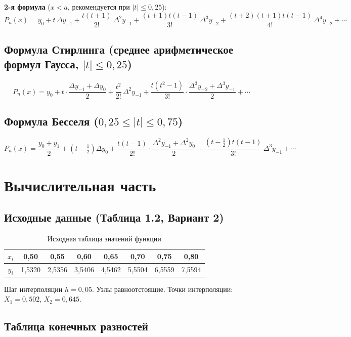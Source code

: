 \documentclass[a4paper,12pt]{article}
\begin{document}
\textbf{2-я формула} ($x<a$, рекомендуется при $|t|\le0{,}25$):
\[
  P_n(x)=y_0+t\,\Delta y_{-1}+\frac{t(t+1)}{2!}\,\Delta^2 y_{-1}
  +\frac{(t+1)t(t-1)}{3!}\,\Delta^3 y_{-2}
  +\frac{(t+2)(t+1)t(t-1)}{4!}\,\Delta^4 y_{-2}+\cdots
\]

\subsection{Формула Стирлинга (среднее арифметическое формул Гаусса, $|t|\le0{,}25$)}

\[
  P_n(x)=y_0+t\cdot\frac{\Delta y_{-1}+\Delta y_0}{2}
  +\frac{t^2}{2!}\,\Delta^2 y_{-1}
  +\frac{t(t^2-1)}{3!}\cdot\frac{\Delta^3 y_{-2}+\Delta^3 y_{-1}}{2}+\cdots
\]

\subsection{Формула Бесселя ($0{,}25\le|t|\le0{,}75$)}

\[
  P_n(x)=\frac{y_0+y_1}{2}+\!\left(t-\tfrac12\right)\!\Delta y_0
  +\frac{t(t-1)}{2!}\cdot\frac{\Delta^2 y_{-1}+\Delta^2 y_0}{2}
  +\frac{(t-\frac12)t(t-1)}{3!}\,\Delta^3 y_{-1}+\cdots
\]

\newpage
\section{Вычислительная часть}

\subsection{Исходные данные (Таблица 1.2, Вариант 2)}

\begin{table}[H]
\centering
\caption{Исходная таблица значений функции}
\begin{tabular}{|c|c|c|c|c|c|c|c|}
\hline
$x_i$ & 0{,}50 & 0{,}55 & 0{,}60 & 0{,}65 & 0{,}70 & 0{,}75 & 0{,}80 \\
\hline
$y_i$ & 1{,}5320 & 2{,}5356 & 3{,}5406 & 4{,}5462 & 5{,}5504 & 6{,}5559 & 7{,}5594 \\
\hline
\end{tabular}
\end{table}

Шаг интерполяции $h=0{,}05$. Узлы равноотстоящие.
Точки интерполяции: $X_1=0{,}502$, $X_2=0{,}645$.

\subsection{Таблица конечных разностей}
\end{document}
